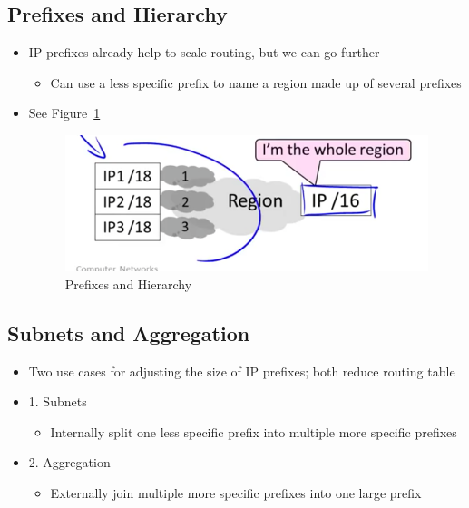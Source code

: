 \documentclass[12pt]{ctexart}   %
\begin{document}
	\subsection{Prefixes and Hierarchy}
	\begin{itemize}
		\item IP prefixes already help to scale routing, but we can go further
		\begin{itemize}
			\item Can use a less specific prefix to name a region made up of several prefixes
		\end{itemize}
		 \item See Figure~\ref{fig:5-10-2}
			
		\begin{figure}[h!] %
		\centering
		 \includegraphics[scale=0.7]{images/5-10-2}
		\caption{ Prefixes and Hierarchy }
		 \label{fig:5-10-2}
		 \end{figure}
	\end{itemize}
	
	\subsection{Subnets and Aggregation}
	\begin{itemize}
		\item Two use cases for adjusting the size of IP prefixes; both reduce routing table
		\item {\color{blue} 1.} Subnets
		\begin{itemize}
			\item Internally split one less specific prefix into multiple more specific prefixes
		\end{itemize}
		
		\item {\color{blue} 2.} Aggregation
		\begin{itemize}
			\item Externally join multiple more specific prefixes into one large prefix
		\end{itemize}
	\end{itemize}
	
\end{document}
